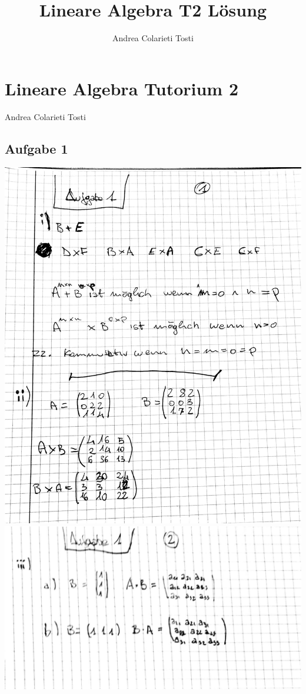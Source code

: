 \documentclass[10pt,a4paper]{article}
\author{Andrea Colarieti Tosti}
\title{Lineare Algebra T2 Lösung}
\begin{document}
\section{Lineare Algebra Tutorium 2}

\begin{center}
	Andrea Colarieti Tosti
\end{center}


\subsection{Aufgabe 1}
	\includegraphics[scale=0.3]{LA_T2_LSG_1.jpg} 
	\newpage
	\includegraphics[scale=0.3]{LA_T2_LSG_2.jpg} 
	\newpage
\end{document}
